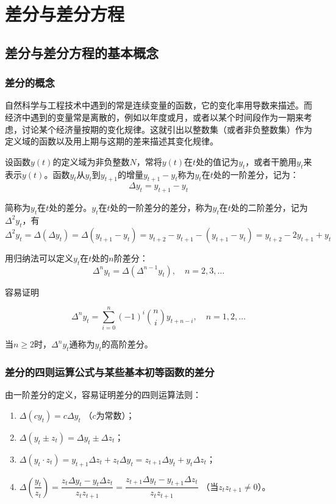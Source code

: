 \chapter{差分与差分方程}

	\section{差分与差分方程的基本概念}

		\subsection{差分的概念}

		自然科学与工程技术中遇到的常是连续变量的函数，它的变化率用导数来描述。而经济中遇到的变量常是离散的，例如以年度或月，或者以某个时间段作为一期来考虑，讨论某个经济量按期的变化规律。这就引出以整数集（或者非负整数集）作为定义域的函数以及用上期与这期的差来描述其变化规律。

		 设函数$y(t)$的{\heiti 定义域为非负整数}$N$，常将$y(t)$在$t$处的值记为$y_t$，或者干脆用$y_t$来表示$y(t)$。函数$y_t$从$y_t$到$y_{t+1}$的增量$y_{t+1} - y_t $称为$y_t$在$t$处的{\heiti 一阶差分}，记为：$$\Delta y_t = y_{t+1} - y_t$$

		简称为$y_t$在$t$处的{\heiti 差分}。$y_t$在$t$处的一阶差分的差分，称为$y_t$在$t$处的{\heiti 二阶差分}，记为$\Delta ^ 2 y_t$，有$$\Delta ^ 2 y_t = \Delta(\Delta y_t) = \Delta(y_{t+1} - y_t) = y_{t+2} - y_{t+1} - (y_{t+1} - y_t) = y_{t+2} - 2y_{t+1} + y_t$$

		用归纳法可以定义$y_t$在$t$处的$n$阶差分：$$\Delta ^n y_t = \Delta(\Delta ^ {n-1} y_t), \quad n=2,3,\ldots $$

		容易证明

		\begin{equation}\label{eq:5-1}
			\Delta ^ n y_t = \sum^n_{i=0} (-1)^i \binom{n}{i} y_{t+n-i}, \quad n = 1,2,\ldots
		\end{equation}

		当$n \geqslant 2$时，$\Delta ^ n y_t$通称为$y_t$的{\heiti 高阶差分}。

		\subsection{差分的四则运算公式与某些基本初等函数的差分}

		由一阶差分的定义，容易证明差分的四则运算法则：

		\begin{enumerate}
			\item $\Delta(cy_t) = c \Delta y_t$ （$c$为常数）；
			\item $\Delta(y_t \pm z_t) = \Delta y_t \pm \Delta z_t$；
			\item $\Delta(y_t\cdot z_t) = y_{t+1} \Delta z_t + z_t \Delta y_t = z_{t+1} \Delta y_t + y_t \Delta z_t $；
			\item $\Delta \left( \dfrac{y_t}{z_t} \right) = \dfrac{z_t \Delta y_t - y_t \Delta z_t}{z_tz_{t+1}} = \dfrac{z_{t+1} \Delta y_t - y_{t+1} \Delta z_t}{z_t z_{t+1}}$ （当$z_t z_{t+1} \neq 0$）。
		\end{enumerate}

